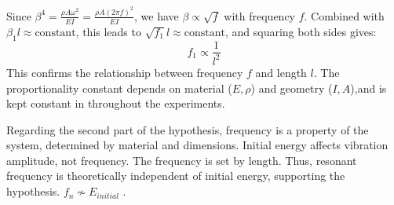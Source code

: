 \documentclass[a4paper,12pt]{article}
\begin{document}
    Since $\beta^4 = \frac{\rho A \omega^2}{EI} = \frac{\rho A (2\pi f)^2}{EI}$, we have $\beta \propto \sqrt{f}$ with frequency $f$. Combined with $\beta_1 l \approx \text{constant}$, this leads to $\sqrt{f_1} l \approx \text{constant}$, and squaring both sides gives:
    \begin{equation}\label{eqn:frequency_length_inverse_square_short}
    f_1 \propto \frac{1}{l^2}
    \end{equation}
    This confirms the relationship between frequency $f$ and length $l$. The proportionality constant depends on material ($E, \rho$) and geometry ($I, A$),and is kept constant in throughout the experiments.

    Regarding the second part of the hypothesis, frequency is a property of the system, determined by material and dimensions. Initial energy affects vibration amplitude, not frequency. The frequency is set by length. Thus, resonant frequency is theoretically independent of initial energy, supporting the hypothesis. $f_{n}\not\sim E_{initial}$
    \autocite{EngMechanics}.
\end{document}

